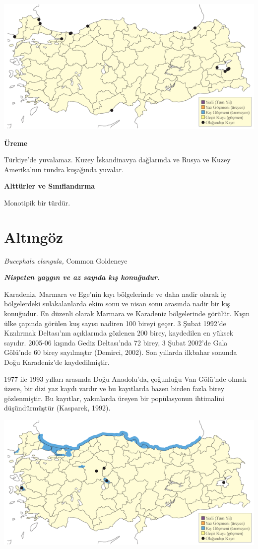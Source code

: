 \documentclass[
  a4paper,
  DIV=11,
  numbers=noendperiod]{scrreprt}
\begin{document}
\includegraphics{images/harita_Page_030.png}

\textbf{Üreme}

Türkiye'de yuvalamaz. Kuzey İskandinavya dağlarında ve Rusya ve Kuzey
Amerika'nın tundra kuşağında yuvalar.

\textbf{Alttürler ve Sınıflandırma}

Monotipik bir türdür.

\section{Altıngöz}\label{altux131nguxf6z}

\emph{Bucephala clangula,} Common Goldeneye

\textbf{\emph{Nispeten yaygın ve az sayıda kış konuğudur.}}

Karadeniz, Marmara ve Ege'nin kıyı bölgelerinde ve daha nadir olarak iç
bölgelerdeki sulakalanlarda ekim sonu ve nisan sonu arasında nadir bir
kış konuğudur. En düzenli olarak Marmara ve Karadeniz bölgelerinde
görülür. Kışın ülke çapında görülen kuş sayısı nadiren 100 bireyi geçer.
3 Şubat 1992'de Kızılırmak Deltası'nın açıklarında gözlenen 200 birey,
kaydedilen en yüksek sayıdır. 2005-06 kışında Gediz Deltası'nda 72
birey, 3 Şubat 2002'de Gala Gölü'nde 60 birey sayılmıştır (Demirci,
2002). Son yıllarda ilkbahar sonunda Doğu Karadeniz'de kaydedilmiştir.

1977 ile 1993 yılları arasında Doğu Anadolu'da, çoğunluğu Van Gölü'nde
olmak üzere, bir dizi yaz kaydı vardır ve bu kayıtlarda bazen birden
fazla birey gözlenmiştir. Bu kayıtlar, yakınlarda üreyen bir
popülasyonun ihtimalini düşündürmüştür (Kasparek, 1992).

\includegraphics{images/harita_Page_031.png}
\end{document}
